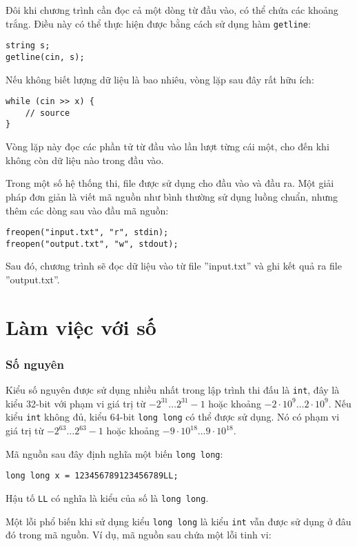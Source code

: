 Đôi khi chương trình cần đọc cả một dòng
từ đầu vào, có thể chứa các khoảng trắng.
Điều này có thể thực hiện được bằng cách sử dụng
hàm \texttt{getline}:

\begin{lstlisting}
string s;
getline(cin, s);
\end{lstlisting}

Nếu không biết lượng dữ liệu là bao nhiêu, vòng lặp
sau đây rất hữu ích:
\begin{lstlisting}
while (cin >> x) {
    // source
}
\end{lstlisting}
Vòng lặp này đọc các phần tử từ đầu vào
lần lượt từng cái một, cho đến khi không còn
dữ liệu nào trong đầu vào.

Trong một số hệ thống thi, file được sử dụng cho
đầu vào và đầu ra.
Một giải pháp đơn giản là viết
mã nguồn như bình thường sử dụng luồng chuẩn,
nhưng thêm các dòng sau vào đầu mã nguồn:
\begin{lstlisting}
freopen("input.txt", "r", stdin);
freopen("output.txt", "w", stdout);
\end{lstlisting}
Sau đó, chương trình sẽ đọc dữ liệu vào từ file
''input.txt'' và ghi kết quả ra file
''output.txt''.

\section{Làm việc với số}


\subsubsection{Số nguyên}

Kiểu số nguyên được sử dụng nhiều nhất trong lập trình thi đấu
là \texttt{int}, đây là kiểu 32-bit với
phạm vi giá trị từ $-2^{31} \ldots 2^{31}-1$
hoặc khoảng $-2 \cdot 10^9 \ldots 2 \cdot 10^9$.
Nếu kiểu \texttt{int} không đủ,
kiểu 64-bit \texttt{long long} có thể được sử dụng.
Nó có phạm vi giá trị từ $-2^{63} \ldots 2^{63}-1$
hoặc khoảng $-9 \cdot 10^{18} \ldots 9 \cdot 10^{18}$.

Mã nguồn sau đây định nghĩa một
biến \texttt{long long}:
\begin{lstlisting}
long long x = 123456789123456789LL;
\end{lstlisting}
Hậu tố \texttt{LL} có nghĩa là
kiểu của số là \texttt{long long}.

Một lỗi phổ biến khi sử dụng kiểu \texttt{long long}
là kiểu \texttt{int} vẫn được sử dụng ở đâu đó
trong mã nguồn.
Ví dụ, mã nguồn sau chứa
một lỗi tinh vi:

